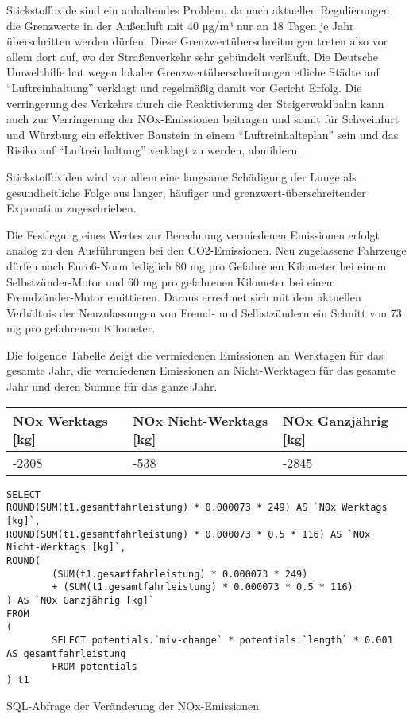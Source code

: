 \documentclass[fontsize=12pt,a4paper]{scrreprt}
\begin{document}
Stickstoffoxide sind ein anhaltendes Problem, da nach aktuellen Regulierungen die Grenzwerte in der Außenluft mit 40 µg/m³ nur an 18 Tagen je Jahr überschritten werden dürfen. Diese Grenzwertüberschreitungen treten also vor allem dort auf, wo der Straßenverkehr sehr gebündelt verläuft. Die Deutsche Umwelthilfe hat wegen lokaler Grenzwertüberschreitungen etliche Städte auf \enquote{Luftreinhaltung} verklagt und regelmäßig damit vor Gericht Erfolg. Die verringerung des Verkehrs durch die Reaktivierung der Steigerwaldbahn kann auch zur Verringerung der NOx-Emissionen beitragen und somit für Schweinfurt und Würzburg ein effektiver Baustein in einem \enquote{Luftreinhalteplan} sein und das Risiko auf \enquote{Luftreinhaltung} verklagt zu werden, abmildern.

\vspace{1em}

Stickstoffoxiden wird vor allem eine langsame Schädigung der Lunge als gesundheitliche Folge aus langer, häufiger und grenzwert-überschreitender Exponation zugeschrieben.

\vspace{1em}

Die Festlegung eines Wertes zur Berechnung vermiedenen Emissionen erfolgt analog zu den Ausführungen bei den CO2-Emissionen. Neu zugelassene Fahrzeuge dürfen nach Euro6-Norm lediglich 80 mg pro Gefahrenen Kilometer bei einem Selbstzünder-Motor und 60 mg pro gefahrenen Kilometer bei einem Fremdzünder-Motor emittieren. Daraus errechnet sich mit dem aktuellen Verhältnis der Neuzulassungen von Fremd- und Selbstzündern ein Schnitt von 73 mg pro gefahrenem Kilometer.

\vspace{1em}

Die folgende Tabelle Zeigt die vermiedenen Emissionen an Werktagen für das gesamte Jahr, die vermiedenen Emissionen an Nicht-Werktagen für das gesamte Jahr und deren Summe für das ganze Jahr.

\vspace{1em}

\begin{tabular}{|l | l | l |}
        \hline
        NOx Werktags [kg] & NOx Nicht-Werktags [kg] & NOx Ganzjährig [kg] \\
        \hline
        -2308             & -538                    & -2845               \\
        \hline
\end{tabular}

\begin{listing}[htbp]
        \begin{verbatim}
SELECT 
ROUND(SUM(t1.gesamtfahrleistung) * 0.000073 * 249) AS `NOx Werktags [kg]`, 
ROUND(SUM(t1.gesamtfahrleistung) * 0.000073 * 0.5 * 116) AS `NOx Nicht-Werktags [kg]`, 
ROUND(
        (SUM(t1.gesamtfahrleistung) * 0.000073 * 249) 
        + (SUM(t1.gesamtfahrleistung) * 0.000073 * 0.5 * 116)
) AS `NOx Ganzjährig [kg]`
FROM
(
        SELECT potentials.`miv-change` * potentials.`length` * 0.001 AS gesamtfahrleistung
        FROM potentials
) t1
\end{verbatim}
        \caption{SQL-Abfrage der Veränderung der NOx-Emissionen}\label{lst-emmissionen-nox}
\end{listing}
\end{document}
